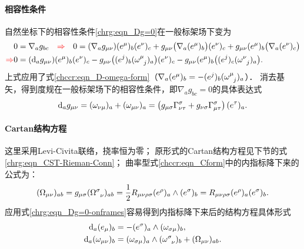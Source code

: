 \paragraph{相容性条件}
自然坐标下的相容性条件\eqref{chrg:eqn_Dg=0}在一般标架场下变为
\setlength{\mathindent}{0em}
\begin{align*}
    &0=\nabla_a g_{bc} \quad {\color{red}\Rightarrow}\quad 0=
    (\nabla_a g_{\mu\nu}) (e^\mu)_b (e^\nu)_c
    +g_{\mu\nu} \bigl(\nabla_a (e^\mu)_b\bigr) (e^\nu)_c
    +g_{\mu\nu}(e^\mu)_b \bigl(\nabla_a (e^\nu)_c \bigr) \\
    {\color{red}\Rightarrow} &0=
    ({\rm d}_a g_{\mu\nu}) (e^\mu)_b (e^\nu)_c
    -g_{\mu\nu} \bigl( (e^j)_b (\omega_{\hphantom{\sigma} j}^{\mu})_a \bigr) (e^\nu)_c
    -g_{\mu\nu}(e^\mu)_b \bigl((e^j)_c (\omega_{\hphantom{\sigma} j}^{\nu})_a \bigr) .
\end{align*}\setlength{\mathindent}{2em}
上式应用了式\eqref{chccr:eqn_D-omega-form}（$\nabla _a (e^\mu)_b=- (e^j)_b (\omega_{\hphantom{\sigma} j}^{\mu})_a$）．
消去基矢，得到度规在一般标架场下的相容性条件，即$\nabla_a g_{bc}=0$的具体表达式
\begin{equation}\label{chrg:eqn_Dg=0-onframes}
    {\rm d}_a g_{\mu\nu} 
     = (\omega_{\nu \mu})_a + (\omega_{\mu \nu})_a
     = \left(g_{\mu\sigma}\Gamma^{\sigma}_{\nu\tau}
      + g_{\nu\sigma}\Gamma^{\sigma}_{\mu\tau}\right) (e^\tau)_a .
\end{equation}

\paragraph{Cartan结构方程}
这里采用Levi-Civita联络，挠率恒为零；
原形式的Cartan结构方程见下节的式\eqref{chrg:eqn_CST-Rieman-Conn}；
曲率型式\eqref{chccr:eqn_Cform}中的内指标降下来的公式为：
\begin{equation}\label{chrg:eqn_Cform-down}
    (\Omega_{\mu\nu} )_{ab} 
    = g_{\mu\sigma}(\Omega_{\hphantom{\sigma} \nu} ^{\sigma})_{ab}
    = \frac{1}{2} R_{\mu \nu \rho\sigma}  (e^\rho)_a \wedge (e^\sigma)_b
    = R_{\mu \nu \rho\sigma} (e^\rho)_a (e^\sigma)_b .
\end{equation}
应用式\eqref{chrg:eqn_Dg=0-onframes}容易得到内指标降下来后的结构方程具体形式
\begin{subequations}\label{chrg:eqn_CST-down}
    \begin{align}
        {\rm d}_a (e_\mu)_b &=- (e^\sigma)_a \wedge (\omega_{\sigma \mu})_b  , \label{chrg:eqn_CST-down-I} \\
        {\rm d}_a (\omega _{\mu\nu})_b  &= (\omega_{\sigma \mu})_a \wedge (\omega _{\hphantom{\sigma} \nu} ^\sigma  )_b
          + (\Omega_{\mu \nu})_{ab}  . \label{chrg:eqn_CST-down-II}
    \end{align}
\end{subequations}

